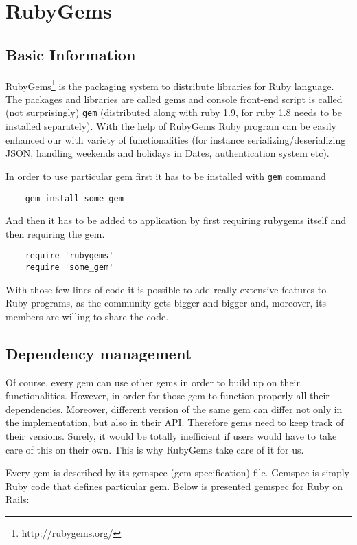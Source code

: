   \section{RubyGems}
    \subsection{Basic Information}
  RubyGems\footnote{http://rubygems.org/} is the packaging system to distribute libraries for Ruby language. The packages and libraries are called gems and console front-end script is called (not surprisingly) \texttt{gem} (distributed along with ruby 1.9, for ruby 1.8 needs to be installed separately). With the help of RubyGems Ruby program can be easily enhanced our with variety of functionalities (for instance serializing/deserializing JSON, handling weekends and holidays in Dates, authentication system etc). 
  
  In order to use particular gem first it has to be installed with \texttt{gem} command 
  \begin{lstlisting}
    gem install some_gem
  \end{lstlisting}
  
  And then it has to be added to application by first requiring rubygems itself and then requiring the gem.
  
  \begin{lstlisting}
    require 'rubygems'
    require 'some_gem'
  \end{lstlisting}
  
  With those few lines of code it is possible to add really extensive features to Ruby programs, as the community gets bigger and bigger and, moreover, its members are willing to share the code.
  
    \subsection{Dependency management}
  Of course, every gem can use other gems in order to build up on their functionalities. However, in order for those gem to function properly all their dependencies. Moreover, different version of the same gem can differ not only in the implementation, but also in their API. Therefore gems need to keep track of their versions. Surely, it would be totally inefficient if users would have to take care of this on their own. This is why RubyGems take care of it for us.
  
  Every gem is described by its gemspec (gem specification) file. Gemspec is simply Ruby code that defines particular gem. Below is presented gemspec for Ruby on Rails:
  
